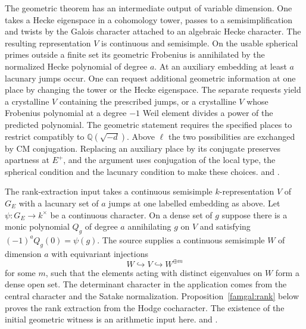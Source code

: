 The geometric theorem has an intermediate output of variable dimension.
One takes a Hecke eigenspace in a cohomology tower, passes to a semisimplification
and twists by the Galois character attached to an algebraic Hecke character.
The resulting representation $V$ is continuous and semisimple. On the usable
spherical primes outside a finite set its geometric Frobenius is annihilated
by the normalized Hecke polynomial of degree $a$. At an auxiliary embedding
at least $a$ lacunary jumps occur. One can request additional geometric
information at one place by changing the tower or the Hecke eigenspace.
The separate requests yield a crystalline $V$ containing the prescribed jumps,
or a crystalline $V$ whose Frobenius polynomial at a degree $-1$ Weil element
divides a power of the predicted polynomial. The geometric statement requires
the specified places to restrict compatibly to $\mathbb Q(\sqrt{-d})$.
Above $\ell$ the two possibilities are exchanged by CM conjugation. Replacing
an auxiliary place by its conjugate preserves apartness at $E^+$, and the
argument uses conjugation of the local type, the spherical condition and
the lacunary condition to make these choices.
and .

The rank-extraction input takes a continuous semisimple $k$-representation
$V$ of $G_E$ with a lacunary set of $a$ jumps at one labelled embedding
as above. Let $\psi:G_E\to k^\times$ be a continuous character. On a
dense set of $g$ suppose there is a monic polynomial $Q_g$ of degree $a$
annihilating $g$ on $V$ and satisfying $(-1)^a Q_g(0)=\psi(g)$.
The source supplies a continuous semisimple $W$ of dimension $a$ with
equivariant injections
\begin{equation}\label{newgal:injections}
                 W\hookrightarrow V\hookrightarrow W^{\oplus m}
\end{equation}
for some $m$, such that the elements acting with distinct eigenvalues on $W$
form a dense open set. The determinant character in the application comes
from the central character and the Satake normalization. Proposition~\ref{famgal:rank} below proves the rank extraction from the
Hodge cocharacter. The existence of the initial geometric witness is an
arithmetic input here.
and .

